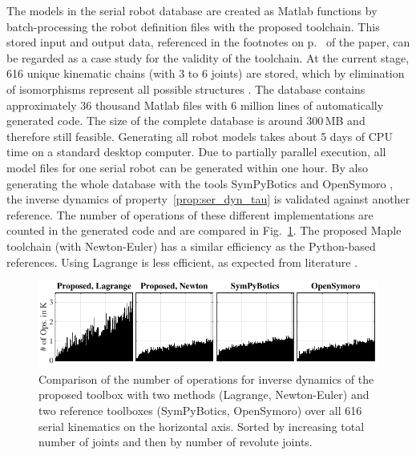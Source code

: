 \documentclass[runningheads]{llncs}
\begin{document}
The models in the serial robot database are created as Matlab functions by batch-processing the robot definition files with the proposed toolchain.
This stored input and output data, referenced in the footnotes on p.~\pageref{page_with_footnotes} of the paper, can be regarded as a case study for the validity of the toolchain.
At the current stage, 616 unique kinematic chains (with 3 to 6 joints) are stored, which by elimination of isomorphisms represent all possible structures \cite{Ramirez2018}.
The database contains approximately 36 thousand Matlab files with 6 million lines of automatically generated code.
The size of the complete database is around 300\,MB and therefore still feasible. %
Generating all robot models takes about 5 days of CPU time on a standard desktop computer.
Due to partially parallel execution, all model files for one serial robot can be generated within one hour.
By also generating the whole database with the tools SymPyBotics \cite{SousaCor2012} and OpenSymoro \cite{KhalilVijKhoMuk2014}, the inverse dynamics of property~\ref{prop:ser_dyn_tau} is validated against another reference.
The number of operations of these different implementations are counted in the generated code and are compared in Fig.~\ref{fig:comparison_numops}.
The proposed Maple toolchain (with Newton-Euler) has a similar efficiency as the Python-based references.
Using Lagrange is less efficient, as expected from literature \cite{KhalilDom2002}.

\begin{figure}[b]
	\vspace{-0.4cm}
	\includegraphics{statistics_serrob_numops_histogram.pdf}
	\vspace{-0.8cm}
	\caption{Comparison of the number of operations for inverse dynamics of the proposed toolbox with two methods (Lagrange, Newton-Euler) and two reference toolboxes (SymPyBotics, OpenSymoro) over all 616 serial kinematics on the horizontal axis. Sorted by increasing total number of joints and then by number of revolute joints.}
	\label{fig:comparison_numops}
\end{figure} 
\end{document}
